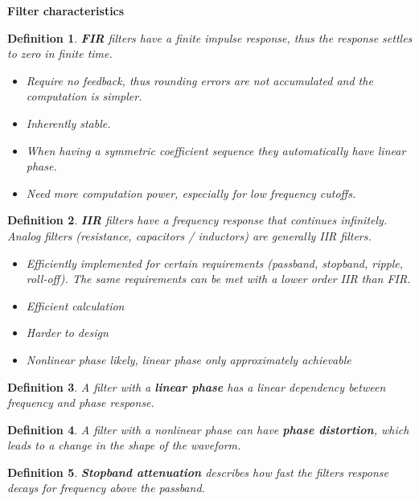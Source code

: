 \documentclass[10pt,a4paper]{scrartcl}
\newtheorem{define}{Definition}
\begin{document}
\begin{multicols*}{2}
\textbf{Filter characteristics}

\begin{define}
\textbf{FIR} filters have a finite impulse response, thus the response settles to zero in finite time. 

\begin{itemize}
\item[+] Require no feedback, thus rounding errors are not accumulated and the computation is simpler.
\item[+] Inherently stable.
\item[+] When having a symmetric coefficient sequence they automatically have linear phase.
\item[-] Need more computation power, especially for low frequency cutoffs.
\end{itemize}
\end{define}

\begin{define}
\textbf{IIR} filters have a frequency response that continues infinitely. Analog filters (resistance, capacitors / inductors) are generally IIR filters.

\begin{itemize}
\item[+] Efficiently implemented for certain requirements (passband, stopband, ripple, roll-off). The same requirements can be met with a lower order IIR than FIR.
\item[+] Efficient calculation
\item[-] Harder to design
\item[-] Nonlinear phase likely, linear phase only approximately achievable
\end{itemize}
\end{define}

\begin{define}
A filter with a \textbf{linear phase} has a linear dependency between frequency and phase response.
\end{define}

\begin{define}
A filter with a nonlinear phase can have \textbf{phase distortion}, which leads to a change in the shape of the waveform.
\end{define}

\begin{define}
\textbf{Stopband attenuation} describes how fast the filters response decays for frequency above the passband.
\end{define}


\end{multicols*}
\end{document}
